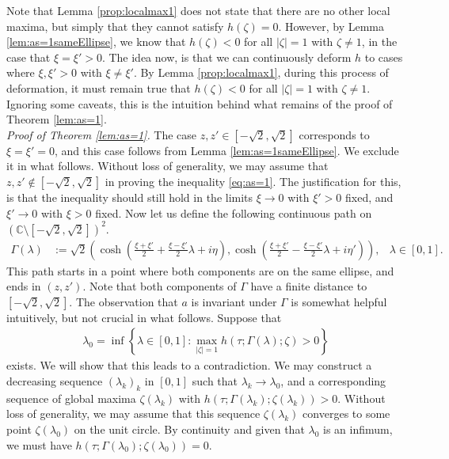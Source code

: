 \documentclass[%
 jmp,
cp,  %
 amsmath,amsthm,amssymb,%
 reprint,%
onecolumn]{revtex4-2}
\begin{document}
Note that Lemma \ref{prop:localmax1} does not state that there are no other local maxima, but simply that they cannot satisfy $h(\zeta)=0$. However, by Lemma \ref{lem:as=1sameEllipse}, we know that $h(\zeta)<0$ for all $|\zeta|=1$ with $\zeta\neq 1$, in the case that $\xi=\xi'>0$. The idea now, is that we can continuously deform $h$ to cases where $\xi, \xi'>0$ with $\xi\neq \xi'$. By Lemma \ref{prop:localmax1}, during this process of deformation, it must remain true that $h(\zeta)<0$ for all $|\zeta|=1$ with $\zeta\neq 1$. Ignoring some caveats, this is the intuition behind what remains of the proof of Theorem \ref{lem:as=1}.\\

\noindent\textit{Proof of Theorem \ref{lem:as=1}.}
The case $z,z'\in [-\sqrt 2, \sqrt 2]$ corresponds to $\xi=\xi'=0$, and this case follows from Lemma \ref{lem:as=1sameEllipse}. We exclude it in what follows. 
Without loss of generality, we may assume that $z,z'\not\in [-\sqrt 2,\sqrt 2]$ in proving the inequality \eqref{eq:as=1}. The justification for this, is that the inequality should still hold in the limits $\xi\to 0$ with $\xi'>0$ fixed, and $\xi'\to 0$ with $\xi>0$ fixed. Now let us define the following continuous path on $\left(\mathbb C\setminus [-\sqrt 2, \sqrt 2]\right)^2$.
\begin{align*}
\Gamma(\lambda) &:= \sqrt 2 \left(\cosh\left(\frac{\xi+\xi'}{2}+\frac{\xi-\xi'}{2} \lambda + i\eta\right),\cosh\left(\frac{\xi+\xi'}{2}-\frac{\xi-\xi'}{2} \lambda+ i \eta'\right)\right), & \lambda\in [0,1].
\end{align*}
This path starts in a point where both components are on the same ellipse, and ends in $(z,z')$. Note that both components of $\Gamma$ have a finite distance to $[-\sqrt 2, \sqrt 2]$. The observation that $a$ is invariant under $\Gamma$ is somewhat helpful intuitively, but not crucial in what follows. Suppose that 
\begin{align*}
\lambda_0 = \inf\left\{\lambda\in[0,1] : \max_{|\zeta|=1} h(\tau;\Gamma(\lambda);\zeta) > 0\right\}
\end{align*}
exists. We will show that this leads to a contradiction. We may construct a decreasing sequence $(\lambda_k)_k$ in $[0,1]$ such that $\lambda_k\to \lambda_0$, and a corresponding sequence of global maxima $\zeta(\lambda_k)$ with $h(\tau;\Gamma(\lambda_k);\zeta(\lambda_k))>0$. Without loss of generality, we may assume that this sequence $\zeta(\lambda_k)$ converges to some point $\zeta(\lambda_0)$ on the unit circle. By continuity and given that $\lambda_0$ is an infimum, we must have $h(\tau;\Gamma(\lambda_0);\zeta(\lambda_0)) = 0$. 
\end{document}

